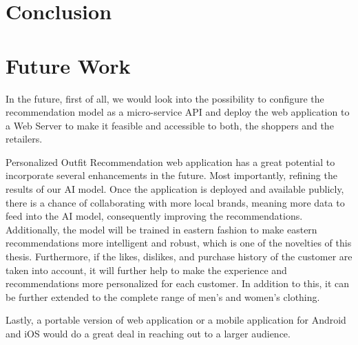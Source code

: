 \section{Conclusion}

\section{Future Work}

In the future, first of all, we would look into the possibility to configure the recommendation model as a micro-service API and deploy the web application to a Web Server to make it feasible and accessible to both, the shoppers and the retailers.

Personalized Outfit Recommendation web application has a great potential to incorporate several enhancements in the future. Most importantly, refining the results of our AI model. Once the application is deployed and available publicly, there is a chance of collaborating with more local brands, meaning more data to feed into the AI model, consequently improving the recommendations. Additionally, the model will be trained in eastern fashion to make eastern recommendations more intelligent and robust, which is one of the novelties of this thesis. Furthermore, if the likes, dislikes, and purchase history of the customer are taken into account, it will further help to make the experience and recommendations more personalized for each customer. In addition to this, it can be further extended to the complete range of men's and women's clothing.

Lastly, a portable version of web application or a mobile application for Android and iOS would do a great deal in reaching out to a larger audience.